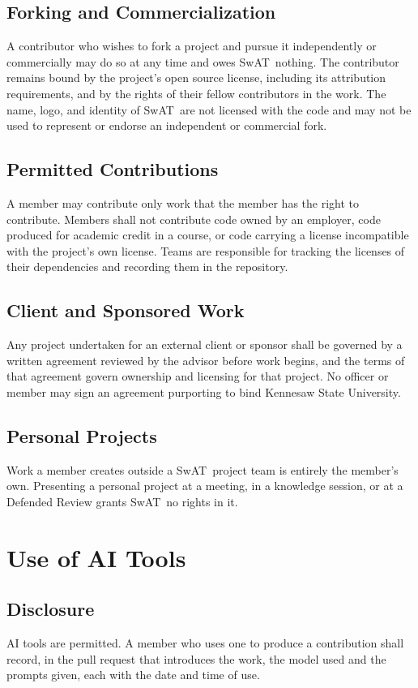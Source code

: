 \documentclass[12pt,letterpaper]{article} %
\newcommand{\orgshort}{SwAT}
\begin{document}
\subsection{Forking and Commercialization}\label{sec:forking}
A contributor who wishes to fork a project and pursue it independently or commercially may do so
at any time and owes \orgshort\ nothing. The contributor remains bound by the project's open
source license, including its attribution requirements, and by the rights of their fellow
contributors in the work. The name, logo, and identity of \orgshort\ are not licensed with the
code and may not be used to represent or endorse an independent or commercial fork.
\subsection{Permitted Contributions}\label{sec:permitted-contributions}
A member may contribute only work that the member has the right to contribute. Members shall not
contribute code owned by an employer, code produced for academic credit in a course, or code
carrying a license incompatible with the project's own license. Teams are responsible for
tracking the licenses of their dependencies and recording them in the repository.
\subsection{Client and Sponsored Work}\label{sec:client-work}
Any project undertaken for an external client or sponsor shall be governed by a written agreement
reviewed by the advisor before work begins, and the terms of that agreement govern ownership and
licensing for that project. No officer or member may sign an agreement purporting to bind
Kennesaw State University.
\subsection{Personal Projects}\label{sec:personal-projects}
Work a member creates outside a \orgshort\ project team is entirely the member's own. Presenting
a personal project at a meeting, in a knowledge session, or at a Defended Review grants
\orgshort\ no rights in it.

\section{Use of AI Tools}\label{art:ai}
\subsection{Disclosure}\label{sec:ai-disclosure}
AI tools are permitted. A member who uses one to produce a contribution shall record, in the
pull request that introduces the work, the model used and the prompts given, each with the date
and time of use.
\end{document}
